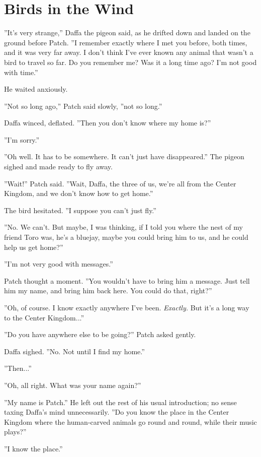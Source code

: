 \documentclass[12pt]{book}
\begin{document}

\section{Birds in the Wind}

''It's very strange,'' Daffa the pigeon said, as he drifted down and landed on the ground before Patch. ''I remember exactly where I met you before, both times, and it was very far away. I don't think I've ever known any animal that wasn't a bird to travel so far. Do you remember me? Was it a long time ago? I'm not good with time.''

He waited anxiously.

''Not so long ago,'' Patch said slowly, ''not so long.''

Daffa winced, deflated. ''Then you don't know where my home is?''

''I'm sorry.''

''Oh well. It has to be somewhere. It can't just have disappeared.'' The pigeon sighed and made ready to fly away.

''Wait!'' Patch said. ''Wait, Daffa, the three of us, we're all from the Center Kingdom, and we don't know how to get home.''

The bird hesitated. ''I suppose you can't just fly.''

''No. We can't. But maybe, I was thinking, if I told you where the nest of my friend Toro was, he's a bluejay, maybe you could bring him to us, and he could help us get home?''

''I'm not very good with messages.''

Patch thought a moment. ''You wouldn't have to bring him a message. Just tell him my name, and bring him back here. You could do that, right?''

''Oh, of course. I know exactly anywhere I've been. {\it Exactly.} But it's a long way to the Center Kingdom...''

''Do you have anywhere else to be going?'' Patch asked gently.

Daffa sighed. ''No. Not until I find my home.''

''Then...''

''Oh, all right. What was your name again?''

''My name is Patch.'' He left out the rest of his usual introduction; no sense taxing Daffa's mind unnecessarily. ''Do you know the place in the Center Kingdom where the human-carved animals go round and round, while their music plays?''

''I know the place.''
\end{document}
